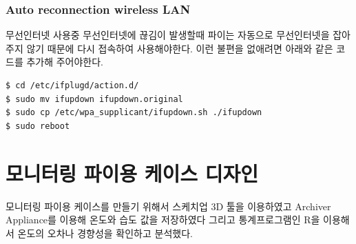 \documentclass[11pt
  , a4paper
  , article
  , oneside
]{memoir}
\begin{document}
\subsection{Auto reconnection wireless LAN}
무선인터넷 사용중 무선인터넷에 끊김이 발생할때 파이는 자동으로 무선인터넷을 잡아주지 않기 때문에 다시 접속하여 사용해야한다. 이런 불편을 없애려면 아래와 같은 코드를 추가해 주어야한다.
\begin{lstlisting}[style=termstyle]
$ cd /etc/ifplugd/action.d/
$ sudo mv ifupdown ifupdown.original
$ sudo cp /etc/wpa_supplicant/ifupdown.sh ./ifupdown
$ sudo reboot
\end{lstlisting}

\chapter{모니터링 파이용 케이스 디자인}
모니터링 파이용 케이스를 만들기 위해서 스케치업 3D 툴을 이용하였고 Archiver Appliance를 이용해 온도와 습도 값을 저장하였다 그리고 통계프로그램인 R을 이용해서 온도의 오차나 경향성을 확인하고 분석했다.
\end{document}
